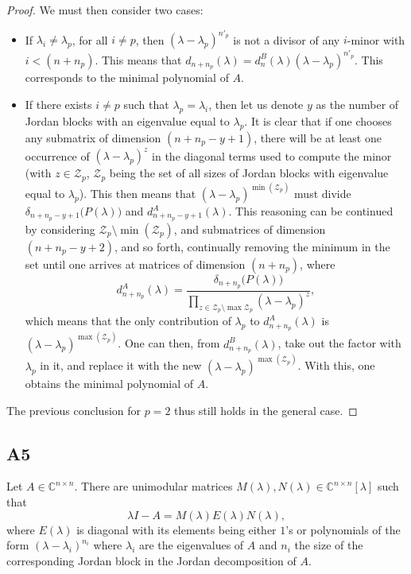 \documentclass[11pt]{article}
\newcommand{\complex}{\mathbb{C}} %
\begin{document}
\begin{proof}
We must then consider two cases:
\begin{itemize}
\item If $\lambda_i \neq \lambda_p$, for all $i\neq p$, then $(\lambda - \lambda_p)^{n'_p}$ is not a divisor of any \(i\)-minor with $i < (n+n_p)$.
This means that $d_{n+n_p}(\lambda) = d_{n}^{B}(\lambda) (\lambda - \lambda_p)^{n'_p}$.
This corresponds to the minimal polynomial of \(A\).
\item If there exists $i \neq p$ such that $\lambda_p = \lambda_i$, then let us denote $y$ as the number of Jordan blocks with an eigenvalue equal to $\lambda_p$. It is clear that if one chooses any submatrix of dimension $(n+n_p-y+1)$, there will be at least one occurrence of $(\lambda - \lambda_p)^{z}$ in the diagonal terms used to compute the minor (with $z \in \mathcal{Z}_p$, $\mathcal{Z}_p$ being the set of all sizes of Jordan blocks with eigenvalue equal to $\lambda_p$).
This then means that $(\lambda - \lambda_p)^{\min(\mathcal{Z}_p)}$ must divide $\delta_{n+n_p-y+1}\big(P(\lambda)\big)$ and $d_{n+n_p-y+1}^{A}(\lambda)$.
This reasoning can be continued by considering  $\mathcal{Z}_p \setminus \min(\mathcal{Z}_p)$, and submatrices of dimension $(n+n_p-y+2)$, and so forth, continually removing the minimum in the set until one arrives at matrices of dimension $(n+n_p)$, where
\[
d_{n+n_p}^{A}(\lambda) = \frac{\delta_{n+n_p}\big(P(\lambda)\big)}{\prod_{z \in \mathcal{Z}_p\setminus \max{\mathcal{Z}_p}}(\lambda - \lambda_p)^{z}},
\]
which means that the only contribution of $\lambda_p$ to $d_{n+n_p}^{A}(\lambda)$ is $(\lambda - \lambda_p)^{\max(\mathcal{Z}_p)}$. One can then, from $d_{n+n_p}^{B}(\lambda)$, take out the factor with $\lambda_p$ in it, and replace it with the new $(\lambda - \lambda_p)^{\max(\mathcal{Z}_p)}$. With this, one obtains the minimal polynomial of \(A\).
\end{itemize}
The previous conclusion for \(p=2\) thus still holds in the general case.
\end{proof}

\subsection*{A5}
Let $A\in \complex^{n\times n}$. There are unimodular matrices $M(\lambda), N(\lambda) \in \complex^{n\times n}[\lambda]$ such that 
\[
\lambda I - A = M(\lambda)E(\lambda)N(\lambda),
\]
where $E(\lambda)$ is diagonal with its elements being either \(1\)'s or polynomials of the form $(\lambda - \lambda_i)^{n_i}$ where $\lambda_i$ are the eigenvalues of \(A\) and $n_i$ the size of the corresponding Jordan block in the Jordan decomposition of \(A\).
\end{document}
